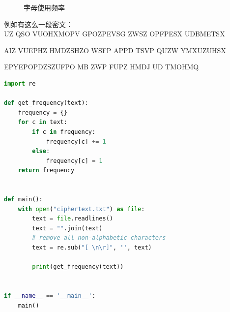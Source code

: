 \begin{figure}[H]
    \centering
    \caption{字母使用频率}
\end{figure}

例如有这么一段密文：\\

UZ QSO VUOHXMOPV GPOZPEVSG ZWSZ OPFPESX UDBMETSX

AIZ VUEPHZ HMDZSHZO WSFP APPD TSVP QUZW YMXUZUHSX

EPYEPOPDZSZUFPO MB ZWP FUPZ HMDJ UD TMOHMQ\\


\begin{lstlisting}[language=Python]
import re

def get_frequency(text):
    frequency = {}
    for c in text:
        if c in frequency:
            frequency[c] += 1
        else:
            frequency[c] = 1
    return frequency


def main():
    with open("ciphertext.txt") as file:
        text = file.readlines()
        text = "".join(text)   
        # remove all non-alphabetic characters
        text = re.sub("[ \n\r]", '', text)

        print(get_frequency(text))


if __name__ == '__main__':
    main()
\end{lstlisting}

